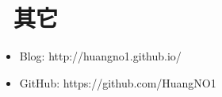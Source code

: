 \documentclass[11pt, a4paper]{article}
\begin{document}
\section{\color{CVBlue}\faInfo\ 其它}
\begin{itemize}[parsep=0.5ex]
  \item Blog: http://huangno1.github.io/
  \item GitHub: https://github.com/HuangNO1
\end{itemize}
\end{document}
